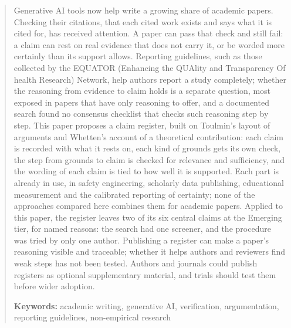 
\begin{abstract}
Generative AI tools now help write a growing share of academic papers.
Checking their citations, that each cited work exists and says what it
is cited for, has received attention.  A paper can pass that check and
still fail: a claim can rest on real evidence that does not carry it,
or be worded more certainly than its support allows.  Reporting
guidelines, such as those collected by the EQUATOR (Enhancing the
QUAlity and Transparency Of health Research) Network, help authors
report a study completely; whether the reasoning from evidence to claim
holds is a separate question, most exposed in papers that have only
reasoning to offer, and a documented search found no consensus
checklist that checks such reasoning step by step.  This paper proposes
a claim register, built on Toulmin's layout of arguments and Whetten's
account of a theoretical contribution: each claim is recorded with what
it rests on, each kind of grounds gets its own check, the step from
grounds to claim is checked for relevance and sufficiency, and the
wording of each claim is tied to how well it is supported.  Each part
is already in use, in safety engineering, scholarly data publishing,
educational measurement and the calibrated reporting of certainty; none
of the approaches compared here combines them for academic papers.
Applied to this paper, the register leaves two of its six central
claims at the Emerging tier, for named reasons: the search had one
screener, and the procedure was tried by only one author.
Publishing a register can make a paper's reasoning visible and
traceable; whether it helps authors and reviewers find weak steps has
not been tested.  Authors and journals could publish registers as
optional supplementary material, and trials should test them before
wider adoption.

\medskip\noindent
\textbf{Keywords:} academic writing, generative AI, verification,
argumentation, reporting guidelines, non-empirical research
\end{abstract}
